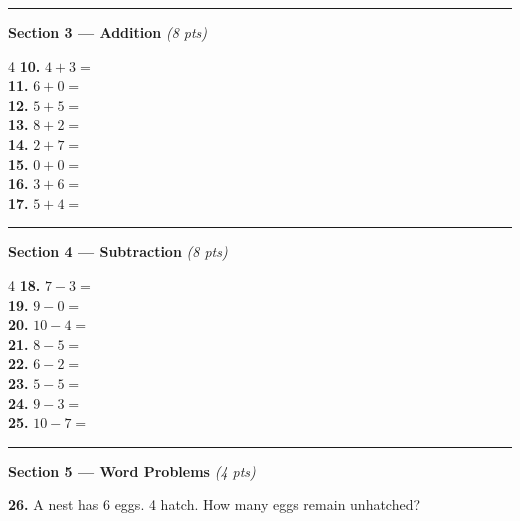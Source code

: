 \documentclass[12pt, letterpaper]{article}
\newcommand{\numbox}{\fbox{\hspace{0.6cm}\vphantom{0}}}
\begin{document}
\bigskip
\noindent\textcolor{scholared}{\rule{\linewidth}{0.4pt}}

\noindent\textcolor{scholared}{\large\textbf{Section 3 — Addition}} \hfill \textit{(8 pts)}

\bigskip
\begin{multicols}{4}
\noindent\textbf{10.} $4+3=$ \numbox \\[10pt]
\noindent\textbf{11.} $6+0=$ \numbox \\
\columnbreak
\noindent\textbf{12.} $5+5=$ \numbox \\[10pt]
\noindent\textbf{13.} $8+2=$ \numbox \\
\columnbreak
\noindent\textbf{14.} $2+7=$ \numbox \\[10pt]
\noindent\textbf{15.} $0+0=$ \numbox \\
\columnbreak
\noindent\textbf{16.} $3+6=$ \numbox \\[10pt]
\noindent\textbf{17.} $5+4=$ \numbox \\
\end{multicols}

\bigskip
\noindent\textcolor{scholared}{\rule{\linewidth}{0.4pt}}

\noindent\textcolor{scholared}{\large\textbf{Section 4 — Subtraction}} \hfill \textit{(8 pts)}

\bigskip
\begin{multicols}{4}
\noindent\textbf{18.} $7-3=$ \numbox \\[10pt]
\noindent\textbf{19.} $9-0=$ \numbox \\
\columnbreak
\noindent\textbf{20.} $10-4=$ \numbox \\[10pt]
\noindent\textbf{21.} $8-5=$ \numbox \\
\columnbreak
\noindent\textbf{22.} $6-2=$ \numbox \\[10pt]
\noindent\textbf{23.} $5-5=$ \numbox \\
\columnbreak
\noindent\textbf{24.} $9-3=$ \numbox \\[10pt]
\noindent\textbf{25.} $10-7=$ \numbox \\
\end{multicols}

\bigskip
\noindent\textcolor{scholared}{\rule{\linewidth}{0.4pt}}

\noindent\textcolor{scholared}{\large\textbf{Section 5 — Word Problems}} \hfill \textit{(4 pts)}

\bigskip
\noindent\textbf{26.} A nest has 6 eggs. 4 hatch. How many eggs remain unhatched?
\end{document}
